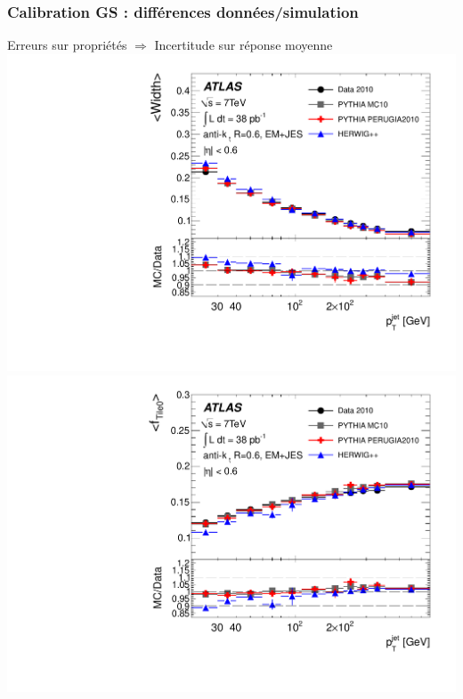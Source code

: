 \begin{frame}
\frametitle{Calibration GS : diff\'erences donn\'ees/simulation}

\begin{maliste}
\item Erreurs sur propri\'et\'es $\Rightarrow$ Incertitude sur r\'eponse moyenne
\includegraphics[width=.37\textwidth]{Figures/JES/fig_50c.pdf}
\quad
\includegraphics[width=.37\textwidth]{Figures/JES/fig_50d.pdf}
\end{maliste}


\end{frame}
